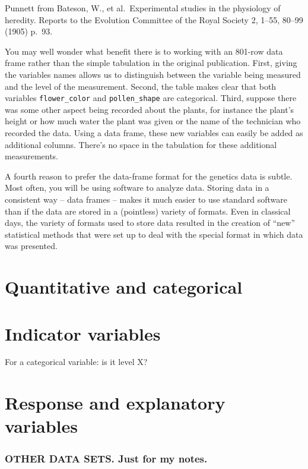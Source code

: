 \documentclass[]{book}
\begin{document}
Punnett from Bateson, W., et al.~Experimental studies in the physiology of heredity. Reports to the Evolution Committee of the Royal Society 2, 1--55, 80--99 (1905) p.~93.

You may well wonder what benefit there is to working with an 801-row data frame rather than the simple tabulation in the original publication. First, giving the variables names allows us to distinguish between the variable being measured and the level of the measurement. Second, the table makes clear that both variables \texttt{flower\_color} and \texttt{pollen\_shape} are categorical. Third, suppose there was some other aspect being recorded about the plants, for instance the plant's height or how much water the plant was given or the name of the technician who recorded the data. Using a data frame, these new variables can easily be added as additional columns. There's no space in the tabulation for these additional measurements.

A fourth reason to prefer the data-frame format for the genetics data is subtle. Most often, you will be using software to analyze data. Storing data in a consistent way -- data frames -- makes it much easier to use standard software than if the data are stored in a (pointless) variety of formats. Even in classical days, the variety of formats used to store data resulted in the creation of ``new'' statistical methods that were set up to deal with the special format in which data was presented.

\hypertarget{quantitative-and-categorical}{%
\section{Quantitative and categorical}\label{quantitative-and-categorical}}

\hypertarget{indicator-variables}{%
\section{Indicator variables}\label{indicator-variables}}

For a categorical variable: is it level X?

\hypertarget{response-and-explanatory-variables}{%
\section{Response and explanatory variables}\label{response-and-explanatory-variables}}

\hypertarget{other-data-sets.-just-for-my-notes.}{%
\subsubsection*{OTHER DATA SETS. Just for my notes.}\label{other-data-sets.-just-for-my-notes.}}
\end{document}
